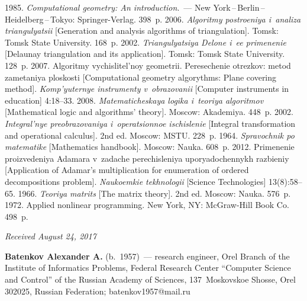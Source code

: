 \begin{multicols}{2}
{{\begin{thebibliography}{99}
 1985. \textit{Computational geometry: An 
introduction}.~--- New York\,--\,Berlin\,--\,Heidelberg\,--\,Tokyo: Springer-Verlag. 398~p.
 2006. \textit{Algoritmy postroeniya 
i~analiza triangulyatsii} [Generation and analysis algorithms of triangulation]. 
Tomsk: Tomsk State University. 168~p.
 2002. \textit{Triangulyatsiya Delone i~ee primenenie} 
[Delaunay triangulation and its application]. Tomsk: Tomsk State University. 128~p.
 2007. Algoritmy vychislitel'noy 
geometrii. Peresechenie otrezkov: metod zametaniya ploskosti [Computational 
geometry algorythms: Plane covering method]. \textit{Komp'yuternye instrumenty 
v~obrazovanii} [Computer instruments in education] 4:18--33.
 2008. \textit{Matematicheskaya logika i~teoriya algoritmov} 
[Mathematical logic and algorithms' theory]. Moscow: Akademiya. 448~p.
 2002. \textit{Integral'nye 
preobrazovaniya i~operatsionnoe ischislenie} [Integral 
transformation and operational calculus]. 2nd ed. Moscow: MSTU. 228~p.
 1964. \textit{Spra\-voch\-nik po 
matematike} [Mathematics handbook]. Moscow: Nauka. 608~p.
 2012. Primenenie proizvedeniya Adamara v~zadache 
perechisleniya uporyadochennykh razbieniy [Application of Adamar's 
multiplication for enumeration of ordered decompositions problem]. 
\textit{Naukoemkie tekhnologii} [Science Technologies]  13(8):58--65.
 1966. \textit{Teoriya matrits} [The matrix theory]. 2nd 
ed.  Moscow: Nauka. 576~p.
 1972. Applied nonlinear programming. New York, 
NY: McGraw-Hill Book Co. 498~p.
\end{thebibliography}

 }
 }

\end{multicols}

\vspace*{-3pt}

\hfill{\small\textit{Received August 24, 2017}}

  
  \Contr
  
  \noindent
  \textbf{Batenkov Alexander A.} (b.\ 1957)~--- research engineer, Orel Branch of 
the Institute of Informatics Problems, Federal Research Center ``Computer Science 
and Control'' of the Russian Academy of Sciences, 137~Moskovskoe Shosse, Orel 
302025, Russian Federation; \mbox{batenkov1957@mail.ru}
  
